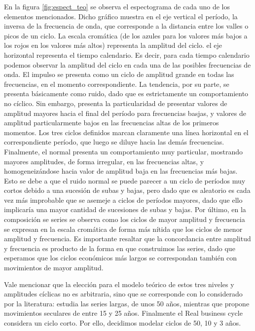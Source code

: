 \documentclass[a4paper]{article}
\begin{document}
En la figura \ref{fig:espect_teo} se observa el espectograma de cada uno de los elementos mencionados. Dicho gráfico muestra en el eje vertical el período, la inversa de la frecuencia de onda, que corresponde a la distancia entre los valles o picos de un ciclo. La escala cromática (de los azules para los valores más bajos a los rojos en los valores más altos) representa la amplitud del ciclo. el eje horizontal representa el tiempo calendario. Es decir, para cada tiempo calendario podemos observar la amplitud del ciclo en cada una de las posibles frecuencias de onda. El impulso se presenta como un ciclo de amplitud grande en todas las frecuencias, en el momento correspondiente. La tendencia, por su parte, se presenta básicamente como ruido, dado que es estrictamente un comportamiento no cíclico. Sin embargo, presenta la particularidad de presentar valores de amplitud mayores hacia el final del período para frecuencias basjas, y valores de amplitud particularmente bajos en las frecuencias altas de los primeros momentos.
Los tres ciclos definidos marcan claramente una línea horizontal en el correspondiente período, que luego se diluye hacia las demás frecuencias. Finalmente, el normal presenta un comportamiento muy particular, mostrando mayores amplitudes, de forma irregular, en las frecuencias altas, y homogeneizándose hacia valor de amplitud baja en las frecuencias más bajas. Esto se debe a que el ruido normal se puede parecer a un ciclo de períodos muy cortos debido a una sucesión de subas y bajas, pero dado que es aleatorio es cada vez más improbable que se asemeje a ciclos de períodos mayores, dado que ello implicaría una mayor cantidad de sucesiones de subas y bajas. 
Por último, en la composición se series se observa como los ciclos de mayor amplitud y frecuencia se expresan en la escala cromática de forma más nítida que los ciclos de menor amplitud y frecuencia. Es importante resaltar que la concordancia entre amplitud y frecuencia es producto de la forma en que construimos las series, dado que esperamos que los ciclos económicos más largos se correspondan también con movimientos de mayor amplitud.

Vale mencionar que la elección para el modelo teórico de estos tres niveles y amplitudes cíclicas no es arbitraria, sino que se corresponde con lo considerado por la literatura: \cite{kondratieff1979long} estudia las series largas, de unos 50 años, mientras que \cite{kuznets1930secular} propone movimientos seculares de entre 15 y 25 años. Finalmente el Real business cycle \citep{kydland1982time} considera un ciclo corto. Por ello, decidimos modelar ciclos de 50, 10 y 3 años. 
\end{document}
